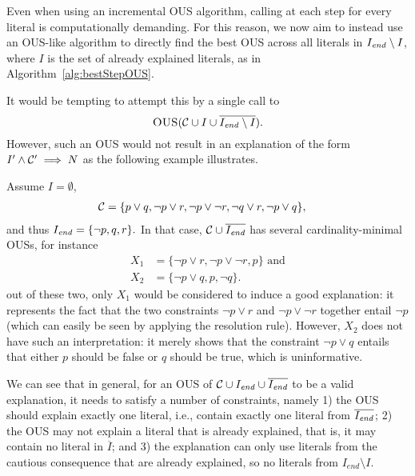 Even when using an incremental OUS algorithm, calling \omusinc at each step for every literal is computationally demanding. %
For this reason, we now aim to instead use an OUS-like algorithm to directly find the best OUS across all literals in $I_{\mathit{end}} \setminus I$, where $I$ is the set of already explained literals, as in Algorithm~\ref{alg:bestStepOUS}. 

It would be tempting to attempt this by a single call to 
\[\textsc{OUS}(\mathcal{C}  \cup I \cup \overline{I_{\mathit{end}}\setminus I}).\]
However, such an OUS would not result in an explanation of the form $I' \wedge \mathcal{C} ' \implies N$ as the following example illustrates. 
\begin{example}
Assume $I=\emptyset$, \begin{align*}
         \mathcal{C}  &= \{p\lor q, \lnot p \lor r, \lnot p \lor \lnot r, \lnot q\lor r, \lnot p \lor q \},
       \end{align*}
       and thus
$         I_{\mathit{end}} = \{ \lnot p, q, r\}.$
In that case, 
$\mathcal{C} \cup \overline{I_{\mathit{end}}}$ 
has several cardinality-minimal OUSs, for instance 
\begin{align*}
X_1 &=    \{\lnot p \lor r, \lnot p \lor \lnot r, p\}\text{ and}\\
X_2 &= \{\lnot p \lor q ,  p, \lnot q\}.
\end{align*}
out of these two, only $X_1$ would be considered to induce a good explanation: it represents the fact that the two constraints $\lnot p \lor r$ and $ \lnot p \lor \lnot r$ together entail $\lnot p$ (which can easily be seen by applying the resolution rule). However, $X_2$ does not have such an interpretation: it merely shows that the constraint $\lnot p \lor q$ entails that either $p$ should be false or $q$ should be true, which is uninformative. 
\end{example}

We can see that in general, for an OUS of $\mathcal{C}  \cup I_{\mathit{end}} \cup \overline{I_{\mathit{end}}}$ to be a valid explanation, it needs to satisfy a number of constraints, namely 1) the OUS should explain exactly one literal, i.e., contain exactly one literal from $\overline{I_{\mathit{end}}}$; 2) the OUS may not explain a literal that is already explained, that is, it may contain no literal in $\overline{I}$; and 3) the explanation can only use literals from the cautious consequence that are already explained, so no literals from $I_{end} \setminus I$.

